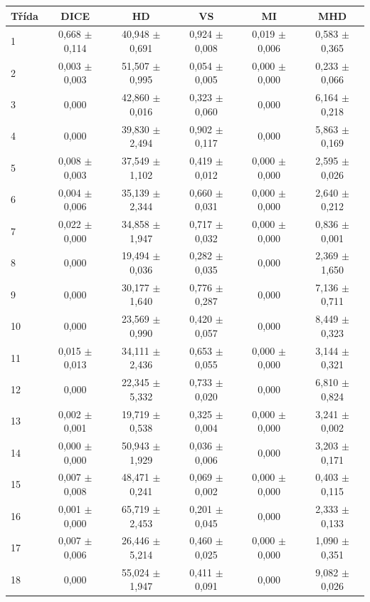 \begin{tabular}{l c c c c c}
 \hline
Třída & DICE & HD & VS & MI & MHD \\ \hline
1 & 0,668 $\pm$ 0,114 & 40,948 $\pm$ 0,691 & 0,924 $\pm$ 0,008 & 0,019 $\pm$ 0,006 & 0,583 $\pm$ 0,365 \\
2 & 0,003 $\pm$ 0,003 & 51,507 $\pm$ 0,995 & 0,054 $\pm$ 0,005 & 0,000 $\pm$ 0,000 & 0,233 $\pm$ 0,066 \\
3 & 0,000 & 42,860 $\pm$ 0,016 & 0,323 $\pm$ 0,060 & 0,000 & 6,164 $\pm$ 0,218 \\
4 & 0,000 & 39,830 $\pm$ 2,494 & 0,902 $\pm$ 0,117 & 0,000 & 5,863 $\pm$ 0,169 \\
5 & 0,008 $\pm$ 0,003 & 37,549 $\pm$ 1,102 & 0,419 $\pm$ 0,012 & 0,000 $\pm$ 0,000 & 2,595 $\pm$ 0,026 \\
6 & 0,004 $\pm$ 0,006 & 35,139 $\pm$ 2,344 & 0,660 $\pm$ 0,031 & 0,000 $\pm$ 0,000 & 2,640 $\pm$ 0,212 \\
7 & 0,022 $\pm$ 0,000 & 34,858 $\pm$ 1,947 & 0,717 $\pm$ 0,032 & 0,000 $\pm$ 0,000 & 0,836 $\pm$ 0,001 \\
8 & 0,000 & 19,494 $\pm$ 0,036 & 0,282 $\pm$ 0,035 & 0,000 & 2,369 $\pm$ 1,650 \\
9 & 0,000 & 30,177 $\pm$ 1,640 & 0,776 $\pm$ 0,287 & 0,000 & 7,136 $\pm$ 0,711 \\
10 & 0,000 & 23,569 $\pm$ 0,990 & 0,420 $\pm$ 0,057 & 0,000 & 8,449 $\pm$ 0,323 \\
11 & 0,015 $\pm$ 0,013 & 34,111 $\pm$ 2,436 & 0,653 $\pm$ 0,055 & 0,000 $\pm$ 0,000 & 3,144 $\pm$ 0,321 \\
12 & 0,000 & 22,345 $\pm$ 5,332 & 0,733 $\pm$ 0,020 & 0,000 & 6,810 $\pm$ 0,824 \\
13 & 0,002 $\pm$ 0,001 & 19,719 $\pm$ 0,538 & 0,325 $\pm$ 0,004 & 0,000 $\pm$ 0,000 & 3,241 $\pm$ 0,002 \\
14 & 0,000 $\pm$ 0,000 & 50,943 $\pm$ 1,929 & 0,036 $\pm$ 0,006 & 0,000 & 3,203 $\pm$ 0,171 \\
15 & 0,007 $\pm$ 0,008 & 48,471 $\pm$ 0,241 & 0,069 $\pm$ 0,002 & 0,000 $\pm$ 0,000 & 0,403 $\pm$ 0,115 \\
16 & 0,001 $\pm$ 0,000 & 65,719 $\pm$ 2,453 & 0,201 $\pm$ 0,045 & 0,000 & 2,333 $\pm$ 0,133 \\
17 & 0,007 $\pm$ 0,006 & 26,446 $\pm$ 5,214 & 0,460 $\pm$ 0,025 & 0,000 $\pm$ 0,000 & 1,090 $\pm$ 0,351 \\
18 & 0,000 & 55,024 $\pm$ 1,947 & 0,411 $\pm$ 0,091 & 0,000 & 9,082 $\pm$ 0,026 \\

\end{tabular}
